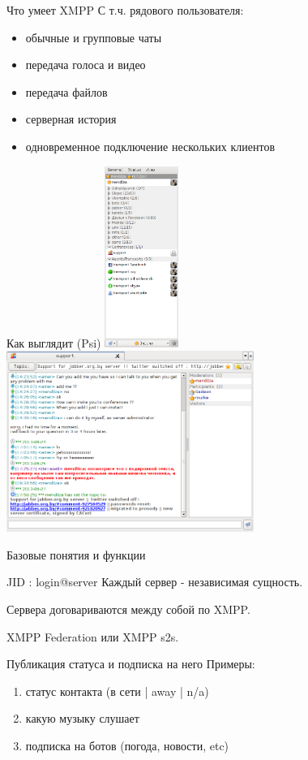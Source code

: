 \begin{frame}{Что умеет XMPP}
  С т.ч. рядового пользователя:
  \begin{itemize}
    \item обычные и групповые чаты
    \item передача голоса и видео
    \item передача файлов
    \item серверная история
    \item одновременное подключение нескольких клиентов
  \end{itemize}
\end{frame}

\begin{frame}{Как выглядит (Psi)}
  \includegraphics[height=5.9cm]{psi-plus}\emph{ }
  \includegraphics[height=5.9cm]{muc}
\end{frame}

\begin{frame}{Базовые понятия и функции}

  \begin{block}{JID : login@server}
    Каждый сервер - независимая сущность. 

    Сервера договариваются между собой по XMPP.

    XMPP Federation или XMPP s2s.
  \end{block} \pause

  \begin{block}{Публикация статуса и подписка на него}
    Примеры: 
    \begin{enumerate}
      \item статус контакта (в сети | away | n/a)
      \item какую музыку слушает
      \item подписка на ботов (погода, новости, etc)
    \end{enumerate}
  \end{block}

\end{frame}


